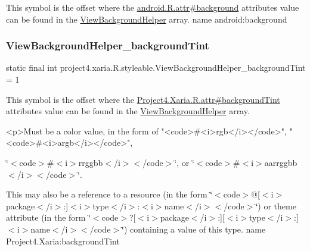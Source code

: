 This symbol is the offset where the \hyperlink{}{android.\+R.\+attr\#background} attribute\textquotesingle{}s value can be found in the \hyperlink{classproject4_1_1xaria_1_1R_1_1styleable_aba3e0fe0ba2d99dd8aaedee442947fbe}{View\+Background\+Helper} array.  name android\+:background \mbox{\label{classproject4_1_1xaria_1_1R_1_1styleable_a27fac5a6cd4f1ec3ff5974130ad03ae1}} 
\subsubsection{\texorpdfstring{View\+Background\+Helper\+\_\+background\+Tint}{ViewBackgroundHelper\_backgroundTint}}
{\footnotesize\ttfamily static final int project4.\+xaria.\+R.\+styleable.\+View\+Background\+Helper\+\_\+background\+Tint = 1\hspace{0.3cm}{\ttfamily [static]}}

This symbol is the offset where the \hyperlink{}{Project4.\+Xaria.\+R.\+attr\#background\+Tint} attribute\textquotesingle{}s value can be found in the \hyperlink{classproject4_1_1xaria_1_1R_1_1styleable_aba3e0fe0ba2d99dd8aaedee442947fbe}{View\+Background\+Helper} array.

\begin{DoxyVerb}      <p>Must be a color value, in the form of "<code>#<i>rgb</i></code>", "<code>#<i>argb</i></code>",
\end{DoxyVerb}
 \char`\"{}$<$code$>$\#$<$i$>$rrggbb$<$/i$>$$<$/code$>$\char`\"{}, or \char`\"{}$<$code$>$\#$<$i$>$aarrggbb$<$/i$>$$<$/code$>$\char`\"{}. 

This may also be a reference to a resource (in the form \char`\"{}$<$code$>$@\mbox{[}$<$i$>$package$<$/i$>$\+:\mbox{]}$<$i$>$type$<$/i$>$\+:$<$i$>$name$<$/i$>$$<$/code$>$\char`\"{}) or theme attribute (in the form \char`\"{}$<$code$>$?\mbox{[}$<$i$>$package$<$/i$>$\+:\mbox{]}\mbox{[}$<$i$>$type$<$/i$>$\+:\mbox{]}$<$i$>$name$<$/i$>$$<$/code$>$\char`\"{}) containing a value of this type.  name Project4.\+Xaria\+:background\+Tint \mbox{\label{classproject4_1_1xaria_1_1R_1_1styleable_a3f5b3d3cb488c190a6f2a6481b79de1d}} 
